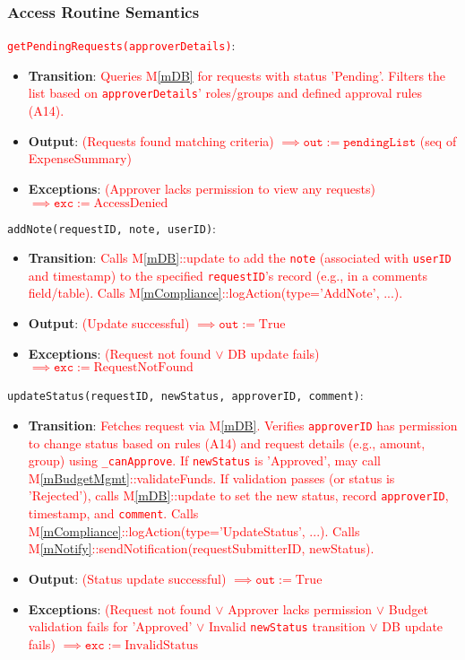 \documentclass[12pt, titlepage]{article}
\providecommand{\mref}[1]{M\ref{#1}}
\begin{document}
\subsubsection{Access Routine Semantics}
\noindent \textcolor{red}{\texttt{getPendingRequests(approverDetails)}}:
\begin{itemize}
    \item \textbf{Transition}: \textcolor{red}{Queries \mref{mDB} for requests with status 'Pending'. Filters the list based on \texttt{approverDetails}' roles/groups and defined approval rules (A14).}
    \item \textbf{Output}: \textcolor{red}{(Requests found matching criteria) $\implies \texttt{out} := \texttt{pendingList}$ (seq of ExpenseSummary)}
    \item \textbf{Exceptions}: \textcolor{red}{(Approver lacks permission to view any requests) $\implies \texttt{exc} := \text{AccessDenied}$}
\end{itemize}

\noindent \texttt{addNote(requestID, note, userID)}:
\begin{itemize}
    \item \textbf{Transition}: \textcolor{red}{Calls \mref{mDB}::update to add the \texttt{note} (associated with \texttt{userID} and timestamp) to the specified \texttt{requestID}'s record (e.g., in a comments field/table). Calls \mref{mCompliance}::logAction(type='AddNote', ...).}
    \item \textbf{Output}: \textcolor{red}{(Update successful) $\implies \texttt{out} := \text{True}$}
    \item \textbf{Exceptions}: \textcolor{red}{(Request not found $\lor$ DB update fails) $\implies \texttt{exc} := \text{RequestNotFound}$}
\end{itemize}

\noindent \texttt{updateStatus(requestID, newStatus, approverID, comment)}:
\begin{itemize}
    \item \textbf{Transition}: \textcolor{red}{Fetches request via \mref{mDB}. Verifies \texttt{approverID} has permission to change status based on rules (A14) and request details (e.g., amount, group) using \texttt{\_canApprove}. If \texttt{newStatus} is 'Approved', may call \mref{mBudgetMgmt}::validateFunds. If validation passes (or status is 'Rejected'), calls \mref{mDB}::update to set the new status, record \texttt{approverID}, timestamp, and \texttt{comment}. Calls \mref{mCompliance}::logAction(type='UpdateStatus', ...). Calls \mref{mNotify}::sendNotification(requestSubmitterID, newStatus).}
    \item \textbf{Output}: \textcolor{red}{(Status update successful) $\implies \texttt{out} := \text{True}$}
    \item \textbf{Exceptions}: \textcolor{red}{(Request not found $\lor$ Approver lacks permission $\lor$ Budget validation fails for 'Approved' $\lor$ Invalid \texttt{newStatus} transition $\lor$ DB update fails) $\implies \texttt{exc} := \text{InvalidStatus}$}
\end{itemize}
\end{document}

